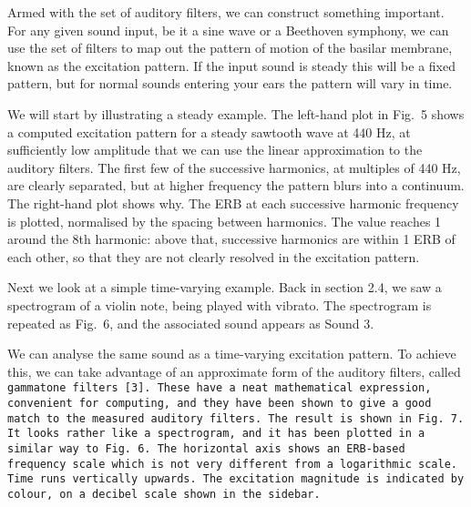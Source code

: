 
  Armed with the set of auditory filters, we can construct something important. 
  For any given sound input, be it a sine wave or a Beethoven symphony, we can 
  use the set of filters to map out the pattern of motion of the basilar 
  membrane, known as the excitation pattern. If the input sound is steady this 
  will be a fixed pattern, but for normal sounds entering your ears the pattern 
  will vary in time. 

  We will start by illustrating a steady example. The left-hand plot in Fig.\ 5 
  shows a computed excitation pattern for a steady sawtooth wave at 440 Hz, at 
  sufficiently low amplitude that we can use the linear approximation to the 
  auditory filters. The first few of the successive harmonics, at multiples of 
  440 Hz, are clearly separated, but at higher frequency the pattern blurs into 
  a continuum. The right-hand plot shows why. The ERB at each successive 
  harmonic frequency is plotted, normalised by the spacing between harmonics. 
  The value reaches 1 around the 8th harmonic: above that, successive harmonics 
  are within 1 ERB of each other, so that they are not clearly resolved in the 
  excitation pattern. 

  Next we look at a simple time-varying example. Back in section 2.4, we saw a 
  spectrogram of a violin note, being played with vibrato. The spectrogram is 
  repeated as Fig.\ 6, and the associated sound appears as Sound 3. 


  We can analyse the same sound as a time-varying excitation pattern. To 
  achieve this, we can take advantage of an approximate form of the auditory 
  filters, called \tt{}gammatone filters\rm{} [3]. These have a neat 
  mathematical expression, convenient for computing, and they have been shown 
  to give a good match to the measured auditory filters. The result is shown in 
  Fig.\ 7. It looks rather like a spectrogram, and it has been plotted in a 
  similar way to Fig.\ 6. The horizontal axis shows an ERB-based frequency 
  scale which is not very different from a logarithmic scale. Time runs 
  vertically upwards. The excitation magnitude is indicated by colour, on a 
  decibel scale shown in the sidebar. 


